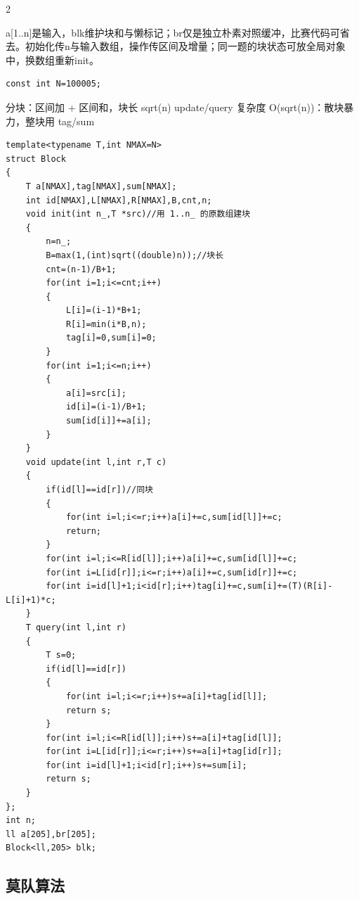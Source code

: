 \documentclass[UTF8,fontset=fandol,a4paper,twoside]{ctexart}
\newcommand{\note}[1]{{\fontsize{10}{12}\selectfont #1\par}}
\begin{document}
\begin{multicols}{2}
\note{a[\allowbreak{}1.\allowbreak{}.\allowbreak{}n]\allowbreak{}是输入，blk维护块和与懒标记；br仅是独立朴素对照缓冲，比赛代码可省去。初始化传n与输入数组，操作传区间及增量；同一题的块状态可放全局对象中，换数组重新init。}
\begin{lstlisting}
const int N=100005;
\end{lstlisting}
\note{分块：区间加 +\allowbreak{} 区间和，块长 sqrt(\allowbreak{}n)\allowbreak{} update/\allowbreak{}query 复杂度 O(\allowbreak{}sqrt(\allowbreak{}n)\allowbreak{})\allowbreak{}：散块暴力，整块用 tag/\allowbreak{}sum}
\begin{lstlisting}
template<typename T,int NMAX=N>
struct Block
{
    T a[NMAX],tag[NMAX],sum[NMAX];
    int id[NMAX],L[NMAX],R[NMAX],B,cnt,n;
    void init(int n_,T *src)//用 1..n_ 的原数组建块
    {
        n=n_;
        B=max(1,(int)sqrt((double)n));//块长
        cnt=(n-1)/B+1;
        for(int i=1;i<=cnt;i++)
        {
            L[i]=(i-1)*B+1;
            R[i]=min(i*B,n);
            tag[i]=0,sum[i]=0;
        }
        for(int i=1;i<=n;i++)
        {
            a[i]=src[i];
            id[i]=(i-1)/B+1;
            sum[id[i]]+=a[i];
        }
    }
    void update(int l,int r,T c)
    {
        if(id[l]==id[r])//同块
        {
            for(int i=l;i<=r;i++)a[i]+=c,sum[id[l]]+=c;
            return;
        }
        for(int i=l;i<=R[id[l]];i++)a[i]+=c,sum[id[l]]+=c;
        for(int i=L[id[r]];i<=r;i++)a[i]+=c,sum[id[r]]+=c;
        for(int i=id[l]+1;i<id[r];i++)tag[i]+=c,sum[i]+=(T)(R[i]-L[i]+1)*c;
    }
    T query(int l,int r)
    {
        T s=0;
        if(id[l]==id[r])
        {
            for(int i=l;i<=r;i++)s+=a[i]+tag[id[l]];
            return s;
        }
        for(int i=l;i<=R[id[l]];i++)s+=a[i]+tag[id[l]];
        for(int i=L[id[r]];i<=r;i++)s+=a[i]+tag[id[r]];
        for(int i=id[l]+1;i<id[r];i++)s+=sum[i];
        return s;
    }
};
int n;
ll a[205],br[205];
Block<ll,205> blk;
\end{lstlisting}
\subsection{莫队算法}


\end{multicols}
\end{document}
